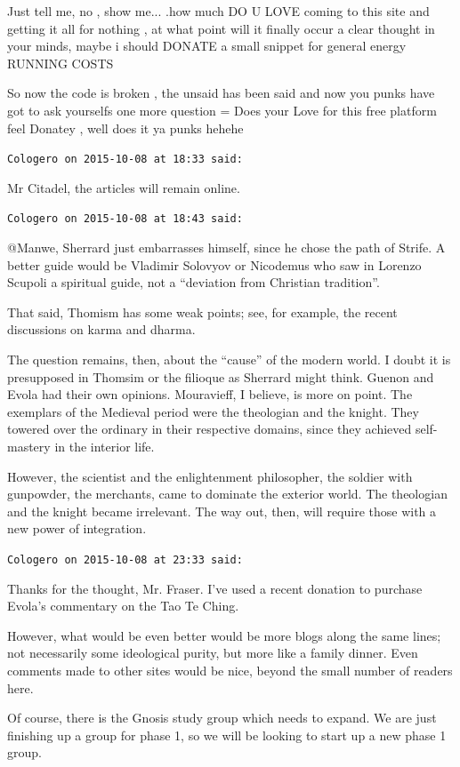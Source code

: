 \begin{footnotesize}
\begin{sffamily}
Just tell me, no , show me... .how much DO U LOVE coming to this site and getting it all for nothing , at what point will it finally occur a clear thought in your minds, maybe i should DONATE a small snippet for general energy RUNNING COSTS

So now the code is broken , the unsaid has been said and now you punks have got to ask yourselfs one more question = Does your Love for this free platform feel Donatey , well does it ya punks hehehe

\hfill

\texttt{Cologero on 2015-10-08 at 18:33 said:}

Mr Citadel, the articles will remain online.

\hfill

\texttt{Cologero on 2015-10-08 at 18:43 said:}

@Manwe, Sherrard just embarrasses himself, since he chose the path of Strife. A better guide would be Vladimir Solovyov or Nicodemus who saw in Lorenzo Scupoli a spiritual guide, not a ``deviation from Christian tradition''.

That said, Thomism has some weak points; see, for example, the recent discussions on karma and dharma.

The question remains, then, about the ``cause'' of the modern world. I doubt it is presupposed in Thomsim or the filioque as Sherrard might think. Guenon and Evola had their own opinions. Mouravieff, I believe, is more on point. The exemplars of the Medieval period were the theologian and the knight. They towered over the ordinary in their respective domains, since they achieved self-mastery in the interior life.

However, the scientist and the enlightenment philosopher, the soldier with gunpowder, the merchants, came to dominate the exterior world. The theologian and the knight became irrelevant. The way out, then, will require those with a new power of integration.

\hfill

\texttt{Cologero on 2015-10-08 at 23:33 said:}

Thanks for the thought, Mr. Fraser. I've used a recent donation to purchase Evola's commentary on the Tao Te Ching.

However, what would be even better would be more blogs along the same lines; not necessarily some ideological purity, but more like a family dinner. Even comments made to other sites would be nice, beyond the small number of readers here.

Of course, there is the Gnosis study group which needs to expand. We are just finishing up a group for phase 1, so we will be looking to start up a new phase 1 group.

\hfill

\end{sffamily}
\end{footnotesize}

